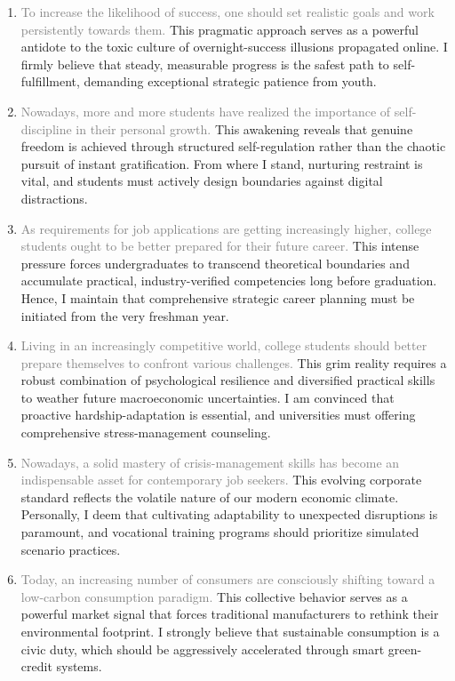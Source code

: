 ﻿\documentclass[lang=cn,11pt]{elegantbook}
\begin{document}
\begin{enumerate}
    \item \textcolor{gray}{To increase the likelihood of success, one should set realistic goals and work persistently towards them.} This pragmatic approach serves as a powerful antidote to the toxic culture of overnight-success illusions propagated online. I firmly believe that steady, measurable progress is the safest path to self-fulfillment, demanding exceptional strategic patience from youth.
    \item \textcolor{gray}{Nowadays, more and more students have realized the importance of self-discipline in their personal growth.} This awakening reveals that genuine freedom is achieved through structured self-regulation rather than the chaotic pursuit of instant gratification. From where I stand, nurturing restraint is vital, and students must actively design boundaries against digital distractions.
    \item \textcolor{gray}{As requirements for job applications are getting increasingly higher, college students ought to be better prepared for their future career.} This intense pressure forces undergraduates to transcend theoretical boundaries and accumulate practical, industry-verified competencies long before graduation. Hence, I maintain that comprehensive strategic career planning must be initiated from the very freshman year.
    \item \textcolor{gray}{Living in an increasingly competitive world, college students should better prepare themselves to confront various challenges.} This grim reality requires a robust combination of psychological resilience and diversified practical skills to weather future macroeconomic uncertainties. I am convinced that proactive hardship-adaptation is essential, and universities must offering comprehensive stress-management counseling.
    \item \textcolor{gray}{Nowadays, a solid mastery of crisis-management skills has become an indispensable asset for contemporary job seekers.} This evolving corporate standard reflects the volatile nature of our modern economic climate. Personally, I deem that cultivating adaptability to unexpected disruptions is paramount, and vocational training programs should prioritize simulated scenario practices.
    \item \textcolor{gray}{Today, an increasing number of consumers are consciously shifting toward a low-carbon consumption paradigm.} This collective behavior serves as a powerful market signal that forces traditional manufacturers to rethink their environmental footprint. I strongly believe that sustainable consumption is a civic duty, which should be aggressively accelerated through smart green-credit systems.

\end{enumerate}
\end{document}
